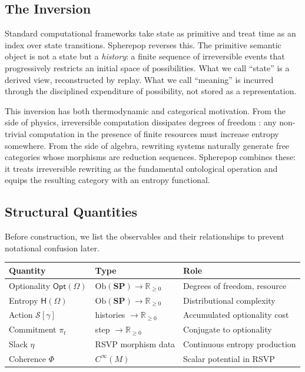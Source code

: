 \documentclass[12pt,a4paper]{article}
\theoremstyle{definition}
\theoremstyle{remark}
\newcommand{\Rnn}{\mathbb{R}_{\ge 0}}
\newcommand{\Ent}{\ensuremath{\mathsf{H}}}
\newcommand{\Opt}{\ensuremath{\mathsf{Opt}}}
\newcommand{\SP}{\mathbf{SP}}
\newcommand{\Ob}{\mathrm{Ob}}
\newcommand{\PhiF}{\Phi}
\begin{document}
\subsection{The Inversion}

Standard computational frameworks take state as primitive and treat time as an index
over state transitions. Spherepop reverses this. The primitive semantic object is not
a state but a \emph{history}: a finite sequence of irreversible events that progressively
restricts an initial space of possibilities. What we call ``state'' is a derived view,
reconstructed by replay. What we call ``meaning'' is incurred through the disciplined
expenditure of possibility, not stored as a representation.

This inversion has both thermodynamic and categorical motivation. From the side of
physics, irreversible computation dissipates degrees of freedom \citep{landauer1961,
bennett1973, GreenAltenkirch2006}: any non-trivial computation in the presence of finite resources must
increase entropy somewhere. From the side of algebra, rewriting systems naturally
generate free categories whose morphisms are reduction sequences. Spherepop combines
these: it treats irreversible rewriting as the fundamental ontological operation and
equips the resulting category with an entropy functional.

\subsection{Structural Quantities}

Before construction, we list the observables and their relationships to prevent
notational confusion later.

\begin{center}
\renewcommand{\arraystretch}{1.4}
\begin{tabular}{lll}
\toprule
\textbf{Quantity} & \textbf{Type} & \textbf{Role} \\
\midrule
Optionality $\Opt(\Omega)$ & $\Ob(\SP)\to\Rnn$ & Degrees of freedom, resource \\
Entropy $\Ent(\Omega)$ & $\Ob(\SP)\to\Rnn$ & Distributional complexity \\
Action $\mathcal{S}[\gamma]$ & histories $\to\Rnn$ & Accumulated optionality cost \\
Commitment $\pi_t$ & step $\to\Rnn$ & Conjugate to optionality \\
Slack $\eta$ & RSVP morphism data & Continuous entropy production \\
Coherence $\PhiF$ & $C^\infty(M)$ & Scalar potential in RSVP \\
\bottomrule
\end{tabular}
\end{center}
\end{document}
